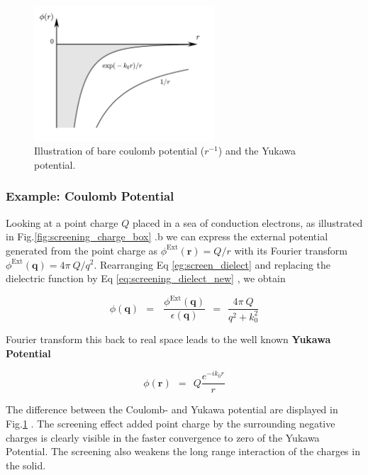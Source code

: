 \documentclass[10pt]{report}
\numberwithin{equation}{chapter}
\newcommand{\myRef}[1]{
  Fig.\ref{#1}
}
\newcommand{\refEq}[1]{
  Eq  \ref{#1}
}
\begin{document}
\begin{figure}
  \centering
  \includegraphics[width=0.6\textwidth]{../img/screening_yukawa.pdf}
  \caption{Illustration of bare coulomb potential ($r^{-1}$) and the Yukawa potential.}
  \label{fig:screening_yukawa}
\end{figure}



\subsubsection{Example: Coulomb Potential}

Looking at a point charge $Q$ placed in a sea of conduction electrons, as illustrated in \myRef{fig:screening_charge_box}.b we can express the external potential generated from the point charge as $\phi^\text{Ext}(\mathbf{r}) = Q/r$ with its Fourier transform  $\phi^\text{Ext}(\mathbf{q}) = 4\pi\ Q/q^2$. Rearranging \refEq{eg:screen_dielect} and replacing the dielectric function by \refEq{eq:screening_dielect_new}, we obtain

\begin{equation}
  \phi(\mathbf{q}) ~~=~~~\frac{\phi^\text{Ext}(\mathbf{q})}{\epsilon(\mathbf{q})} 
  ~~=~~ \frac{4\pi\ Q}{q^2 + k^2_0}
\end{equation}

Fourier transform this back to real space leads to the well known \textbf{Yukawa Potential} 

\begin{equation}
  \phi(\mathbf{r}) ~~=~~ Q \frac{e^{-i k_0 r}}{r}
\end{equation}

The difference between the Coulomb- and Yukawa potential are displayed in \myRef{fig:screening_yukawa}. The screening effect added point charge by the surrounding negative charges is clearly visible in the faster convergence to zero of the Yukawa Potential. The screening also weakens the long range interaction of the charges in the solid.
\end{document}
